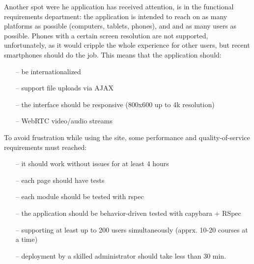 Another spot were he application has received attention, is in the functional requirements department:
the application is intended to reach on as many platforms as possible (computers, tablets, phones), and and
as many users as possible. Phones with a certain screen resolution are not supported, unfortunately, as it
would cripple the whole experience for other users, but recent smartphones
should do the job. This means that the application should:
\begin{enumerate}[topsep=5pt, partopsep=0pt,itemsep=3pt,parsep=1pt]
    \item[--] be internationalized
    \item[--] support file uploads via AJAX
    \item[--] the interface should be responsive (800x600 up to 4k resolution)
    \item[--] WebRTC video/audio streams
\end{enumerate}

To avoid frustration while using the site, some performance and quality-of-service requirements
must reached:
\begin{enumerate}[topsep=5pt, partopsep=0pt,itemsep=3pt,parsep=1pt]
    \item[--] it should work without issues for at least 4 hours
    \item[--] each page should have tests
    \item[--] each module should be tested with rspec
    \item[--] the application should be behavior-driven tested with capybara + RSpec
    \item[--] supporting at least up to 200 users simultaneously (apprx. 10-20 courses at a time)
    \item[--] deployment by a skilled administrator should take less than 30 min.
\end{enumerate}


